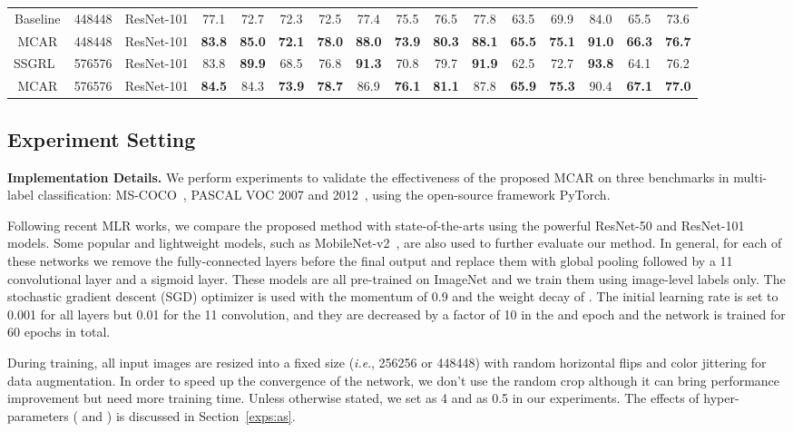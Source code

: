\documentclass[journal]{IEEEtran}
\makeatletter
\DeclareRobustCommand\onedot{\@onedot}
\def\@onedot{.}
\def\ie{\emph{i.e}\onedot}
\makeatother
\begin{document}
\begin{table*}[t]
{\begin{tabular}{|c|c|c||c||c|c|c|c|c|c||c|c|c|c|c|c|}
\hline\hline
Baseline &448448&ResNet-101  &77.1 &72.7 &72.3 &72.5 &77.4 &75.5 &76.5  &77.8 &63.5 &69.9 &84.0 &65.5 &73.6\\
MCAR &448448&ResNet-101  &\textbf{83.8} &\textbf{85.0} &\textbf{72.1} &\textbf{78.0} &\textbf{88.0} &\textbf{73.9} &\textbf{80.3} &\textbf{88.1} &\textbf{65.5} &\textbf{75.1} &\textbf{91.0} &\textbf{66.3} &\textbf{76.7}\\
\hline\hline
SSGRL~\cite{chenlearning}        & 576576           &ResNet-101  &83.8 &\textbf{89.9} &68.5 &76.8 &\textbf{91.3} &70.8 &79.7 &\textbf{91.9} &62.5 &72.7 &\textbf{93.8} &64.1 &76.2 \\
MCAR &576576 &ResNet-101 &\textbf{84.5}  &84.3 &\textbf{73.9} &\textbf{78.7} &86.9 &\textbf{76.1} &\textbf{81.1} &87.8 &\textbf{65.9} &\textbf{75.3} &90.4 &\textbf{67.1} &\textbf{77.0}\\
\hline
\end{tabular}}
\end{table*}

\subsection{Experiment Setting}
\noindent \textbf{Implementation Details.}
We perform experiments to validate the effectiveness of the proposed MCAR on three benchmarks in multi-label classification: MS-COCO~\cite{lin2014microsoft}, PASCAL VOC 2007 and 2012~\cite{everingham2010pascal}, using the open-source framework PyTorch. 

Following recent MLR works, we compare the proposed method with state-of-the-arts using the powerful ResNet-50 and ResNet-101~\cite{he2016deep} models. Some popular and lightweight models, such as MobileNet-v2~\cite{sandlermobilenetv2}, are also used to further evaluate our method. In general, for each of these networks we remove the fully-connected layers before the final output and replace them with global pooling followed by a 11 convolutional layer and a sigmoid layer. These models are all pre-trained on ImageNet and we train them using image-level labels only. The stochastic gradient descent (SGD) optimizer is used with the momentum of 0.9 and the weight decay of . The initial learning rate is set to 0.001 for all layers but 0.01 for the 11 convolution, and they are decreased by a factor of 10 in the  and  epoch and the network is trained for 60 epochs in total.

During training, all input images are resized into a fixed size (\ie, 256256 or 448448) with random horizontal flips and color jittering for data augmentation. In order to speed up the convergence of the network, we don't use the random crop although it can bring performance improvement but need more training time. Unless otherwise stated, we set  as 4 and  as 0.5 in our experiments. The effects of hyper-parameters ( and ) is discussed in Section~\ref{exps:as}. 
\end{document}
